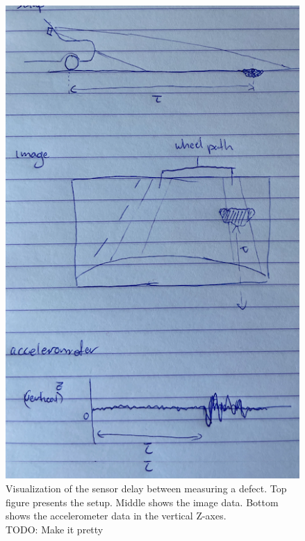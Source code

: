 \begin{figure}[ht]
\begin{center}
\includegraphics[height=18cm,keepaspectratio]{images/2_literature/sensor-delay.png}
\end{center}
\caption{Visualization of the sensor delay between measuring a defect. Top figure presents the setup. Middle shows the image data. Bottom shows the accelerometer data in the vertical Z-axes.\\TODO: Make it pretty}
\label{fig:sensor-delay}
\end{figure}









